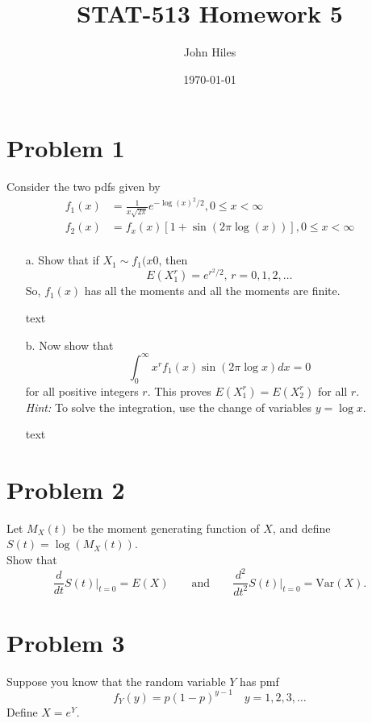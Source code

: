 \documentclass{article}
\title{STAT-513 Homework 5}
\author{John Hiles}
\date\today
\begin{document}
\maketitle %


\section*{Problem 1}
Consider the two pdfs given by
  \[
	\begin{aligned}
    f_1(x)&=\frac{1}{x\sqrt{2\pi}}e^{-\log(x)^2/2}, 0\le x <\infty\\
    f_2(x)&=f_x(x)[1 + \sin(2\pi\log(x))], 0\le x <\infty\\
	\end{aligned}
  \]
    \begin{enumerate}
    \item[a.]
      Show that if $X_1 \sim f_1(x0$, then
      \[
      E(X_{1}^{r}) = e^{r^2/2}, \, r = 0,1,2,\dots
      \]
      So, $f_1(x)$ has all the moments and all the moments are finite.
    \item[]
      text
    \item[b.]
      Now show that
      \[
      \int_{0}^{\infty}x^rf_1(x)\sin(2\pi\log x)dx=0
      \]
      for all positive integers $r$. This proves $E(X_{1}^{r}) = E(X_{2}^{r})$ for all $r$.\\
      \textit{Hint:} To solve the integration, use the change of variables $y = \log x$.
    \item[]
      text
    \end{enumerate}
    \clearpage

\section*{Problem 2}
  Let $M_X(t)$ be the moment generating function of $X$, and define $S(t) = \log(M_X(t))$.\\
  Show that
    \[
    \frac{d}{dt}S(t)\biggr\rvert_{t=0} = E(X) \qquad \textrm{and} \qquad \frac{d^2}{dt^2}S(t)\biggr\rvert_{t=0} = \textrm{Var}(X).
    \]

      \clearpage

\section*{Problem 3}
    Suppose you know that the random variable $Y$ has pmf
    \[
    f_Y(y) = p(1-p)^{y-1} \quad y=1,2,3,\dots
    \]
    Define $X = e^Y$.
\end{document}
